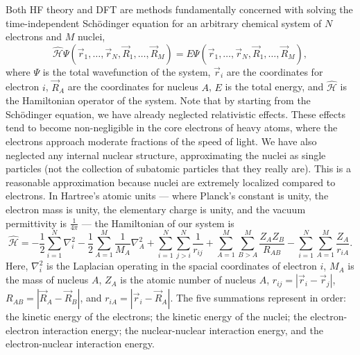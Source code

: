 \documentclass[titlepage,11pt]{article}
\newcommand{\Ham}{\widehat{\mathcal{H}}}
\begin{document}
Both HF theory and DFT are methods fundamentally concerned with solving the time-independent Sch\"{o}dinger equation for an arbitrary chemical system of $N$ electrons and $M$ nuclei,
\begin{equation}
	\Ham \Psi(\vec{r}_{1}, \ldots , \vec{r}_{N}, \vec{R}_{1}, \ldots , \vec{R}_{M}) = E \Psi(\vec{r}_{1}, \ldots , \vec{r}_{N}, \vec{R}_{1}, \ldots , \vec{R}_{M}),
	\label{Schrodinger}
\end{equation}
where $\Psi$ is the total wavefunction of the system, $\vec{r}_{i}$ are the coordinates for electron $i$, $\vec{R}_{A}$ are the coordinates for nucleus $A$, $E$ is the total energy, and $\Ham$ is the Hamiltonian operator of the system. Note that by starting from the Sch\"{o}dinger equation, we have already neglected relativistic effects. These effects tend to become non-negligible in the core electrons of heavy atoms, where the electrons approach moderate fractions of the speed of light. We have also neglected any internal nuclear structure, approximating the nuclei as single particles (not the collection of subatomic particles that they really are). This is a reasonable approximation because nuclei are extremely localized compared to electrons. In Hartree's atomic units --- where Planck's constant is unity, the electron mass is unity, the elementary charge is unity, and the vacuum permittivity is $\frac{1}{4\pi}$ --- the Hamiltonian of our system is
\begin{equation}
	\Ham = -\frac{1}{2}\sum_{i=1}^{N} \nabla_{i}^{2} -\frac{1}{2} \sum_{A=1}^{M} \frac{1}{M_{A}} \nabla_{A}^{2} + 
	\sum_{i=1}^{N} \sum_{j>i}^{N} \frac{1}{r_{ij}} + \sum_{A=1}^{M} \sum_{B>A}^{M} \frac{Z_{A} Z_{B}}{R_{AB}} -
	\sum_{i=1}^{N} \sum_{A = 1}^{M} \frac{Z_{A}}{r_{iA}}.
\end{equation}
Here, $\nabla_{i}^{2}$ is the Laplacian operating in the spacial coordinates of electron $i$, $M_{A}$ is the mass of nucleus $A$, $Z_{A}$ is the atomic number of nucleus $A$, $r_{ij} = |\vec{r}_{i} - \vec{r}_{j}|$, $R_{AB} = |\vec{R}_{A} - \vec{R}_{B}|$, and $r_{iA} = |\vec{r}_{i} - \vec{R}_{A}|$. The five summations represent in order: the kinetic energy of the electrons; the kinetic energy of the nuclei; the electron-electron interaction energy; the nuclear-nuclear interaction energy, and the electron-nuclear interaction energy.
\end{document}
